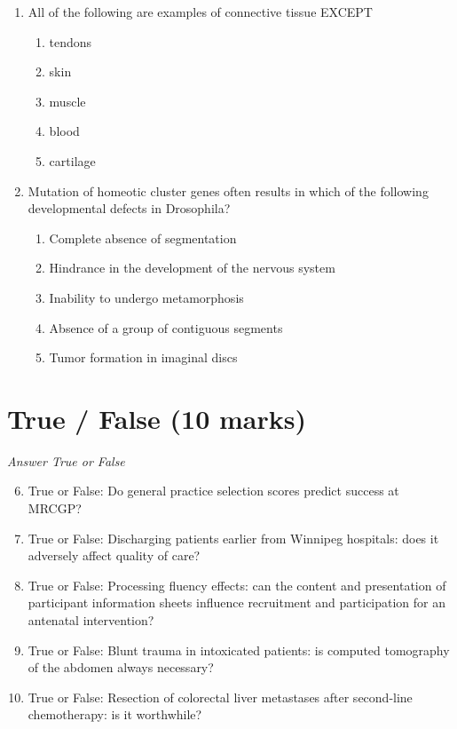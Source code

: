\documentclass[12pt]{article}
\begin{document}
\begin{enumerate}[label=\arabic*.]
\item All of the following are examples of connective tissue EXCEPT
\begin{enumerate}[label=(\alph*)]
    \item tendons
    \item skin
    \item muscle
    \item blood
    \item cartilage
\end{enumerate}
\item Mutation of homeotic cluster genes often results in which of the following developmental defects in Drosophila?
\begin{enumerate}[label=(\alph*)]
    \item Complete absence of segmentation
    \item Hindrance in the development of the nervous system
    \item Inability to undergo metamorphosis
    \item Absence of a group of contiguous segments
    \item Tumor formation in imaginal discs
\end{enumerate}
\end{enumerate}

\section*{True / False (10 marks)}
\textit{Answer True or False}
\begin{enumerate}[label=\arabic*.]
\setcounter{enumi}{5}
\item True or False: Do general practice selection scores predict success at MRCGP?
\item True or False: Discharging patients earlier from Winnipeg hospitals: does it adversely affect quality of care?
\item True or False: Processing fluency effects: can the content and presentation of participant information sheets influence recruitment and participation for an antenatal intervention?
\item True or False: Blunt trauma in intoxicated patients: is computed tomography of the abdomen always necessary?
\item True or False: Resection of colorectal liver metastases after second-line chemotherapy: is it worthwhile?
\end{enumerate}
\end{document}
